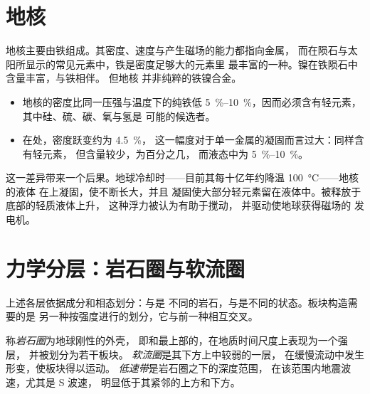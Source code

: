 \section{地核}

地核主要由铁组成。其密度、速度与产生磁场的能力都指向金属，
而在陨石与太阳所显示的常见元素中，铁是密度足够大的元素里
最丰富的一种。镍在铁陨石中含量丰富，与铁相伴。
但地核
并非纯粹的铁镍合金。
\begin{itemize}
  \item 地核的密度比同一压强与温度下的纯铁低
        \qtyrange{5}{10}{\percent}，因而必须含有轻元素，
        其中硅、硫、碳、氧与氢是
        可能的候选者。
  \item 在处，密度跃变约为 \qty{4.5}{\percent}，
        这一幅度对于单一金属的凝固而言过大：同样含有轻元素，
        但含量较少，为百分之几，
        而液态中为 \qtyrange{5}{10}{\percent}。
\end{itemize}
这一差异带来一个后果。地球冷却时——目前其每十亿年约降温
\qty{100}{\degreeCelsius}——地核的液体
在上凝固，使不断长大，并且
凝固使大部分轻元素留在液体中。被释放于底部的轻质液体上升，
这种浮力被认为有助于搅动，
并驱动使地球获得磁场的
发电机。

\section{力学分层：岩石圈与软流圈}

上述各层依据成分和相态划分：与是
不同的岩石，与是不同的状态。板块构造需要的是
另一种按强度进行的划分，它与前一种相互交叉。

\begin{definition}
\label{def:b1:layered-earth:lithosphere}
称\emph{岩石圈}为地球刚性的外壳，
即和最上部的，在地质时间尺度上表现为一个强层，
并被划分为若干板块。
\emph{软流圈}是其下方上中较弱的一层，
在缓慢流动中发生形变，使板块得以运动。
\emph{低速带}是岩石圈之下的深度范围，
在该范围内地震波速，尤其是 S 波速，
明显低于其紧邻的上方和下方。
\end{definition}

